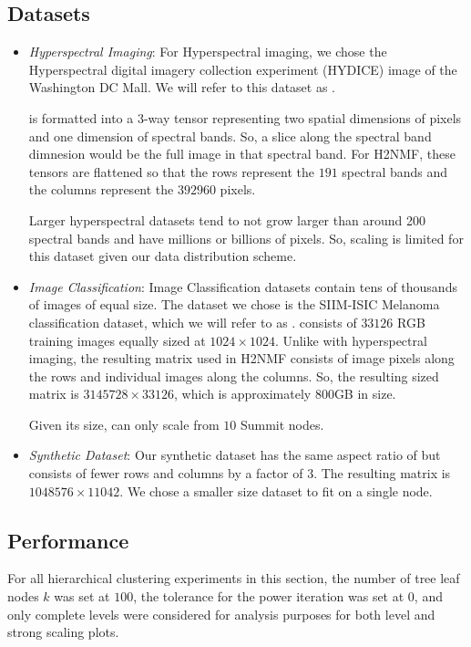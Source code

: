 \subsection{Datasets}
\begin{itemize}
	\item \textit{Hyperspectral Imaging}:
	For Hyperspectral imaging, we chose the Hyperspectral digital imagery collection experiment (HYDICE) image of the Washington DC Mall. We will refer
	to this dataset as \hyper{}\cite{DC-HYDICE}.
	
	\hyper{} is formatted into a 3-way tensor representing two spatial dimensions of pixels and one dimension of spectral bands. So, a slice along
	the spectral band dimnesion would be the full \hyper{} image in that spectral band. For H2NMF, these tensors are flattened so that the rows represent the
	$191$ spectral bands and the columns represent the $392960$ pixels. 

	Larger hyperspectral datasets tend to not grow larger than around 200 spectral bands and have millions or billions of pixels. So, scaling is 
	limited for this dataset given our data distribution scheme.
	\item \textit{Image Classification}:
	Image Classification datasets contain tens of thousands of images of equal size. The dataset we chose is the SIIM-ISIC Melanoma classification
	dataset, which we will refer to as \image{}\cite{SIIM-ISIC}. \image{} consists of $33126$ RGB training images equally sized at $1024 \times 1024$. Unlike with hyperspectral imaging, the resulting
	matrix used in H2NMF consists of image pixels along the rows and individual images along the columns. So, the resulting sized matrix is
	$3145728 \times 33126$, which is approximately 800GB in size. 

	Given its size, \image{} can only scale from $10$ Summit nodes.
	\item \textit{Synthetic Dataset}:
	Our synthetic dataset has the same aspect ratio of \image{} but consists of fewer rows and columns by a factor of $3$. The resulting matrix is $1048576 \times 11042$. 
	We chose a smaller size dataset to fit on a single node.
\end{itemize}

\subsection{Performance}
\label{sec:perf}
For all hierarchical clustering experiments in this section, the number of tree leaf nodes $k$ was set at $100$, the tolerance
for the power iteration was set at $0$, and only complete levels were considered for analysis purposes for both level and strong scaling plots.

